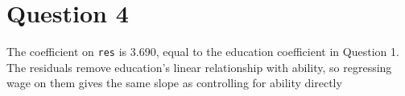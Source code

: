 \section*{Question 4}

The coefficient on \texttt{res} is 3.690, equal to the education coefficient
in Question 1. The residuals remove education's linear relationship with
ability, so regressing wage on them gives the same slope as controlling
for ability directly
